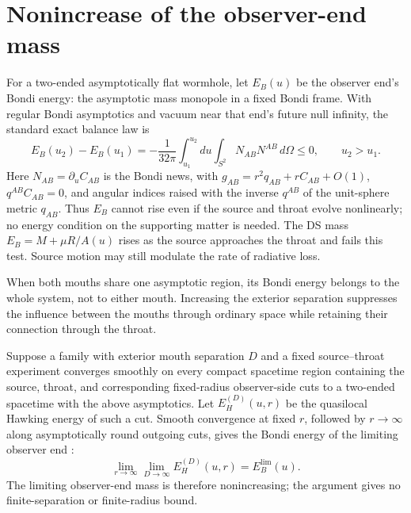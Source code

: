 \documentclass[aps,prd,10pt,onecolumn,nofootinbib,superscriptaddress,floatfix]{revtex4-2}
\begin{document}
\section{Nonincrease of the observer-end mass}
\label{sec:nonlinear}

For a two-ended asymptotically flat wormhole, let $E_B(u)$ be the observer
end's Bondi energy: the asymptotic mass monopole in a fixed Bondi frame.
With regular Bondi asymptotics and vacuum near that end's future null
infinity, the standard exact balance law is
\cite{BondiVanderBurgMetzner1962Gravitational,Sachs1962Asymptotic,
WaldZoupas2000Conserved}
\begin{equation}
 E_B(u_2)-E_B(u_1)
 =-\frac{1}{32\pi}\int_{u_1}^{u_2}du
    \int_{S^2}N_{AB}N^{AB}\,d\Omega\le0,
 \qquad u_2>u_1.
 \label{eq:bondi-integrated}
\end{equation}
Here $N_{AB}=\partial_u C_{AB}$ is the Bondi news, with
$g_{AB}=r^2q_{AB}+rC_{AB}+O(1)$, $q^{AB}C_{AB}=0$, and angular indices
raised with the inverse $q^{AB}$ of the unit-sphere metric $q_{AB}$.
Thus $E_B$ cannot rise even if
the source and throat evolve nonlinearly; no energy condition on the
supporting matter is needed.  The DS mass $E_B=M+\mu R/A(u)$ rises as the
source approaches the throat and fails this test.  Source motion may still
modulate the rate of radiative loss.

When both mouths share one asymptotic region, its Bondi energy belongs
to the whole system, not to either mouth.  Increasing the exterior
separation suppresses the influence between the mouths through ordinary
space while retaining their connection through the throat.

Suppose a family with exterior
mouth separation $D$ and a fixed source--throat experiment converges
smoothly on every compact spacetime region containing the source, throat,
and corresponding fixed-radius observer-side cuts to a two-ended
spacetime with the above asymptotics.  Let $E_H^{(D)}(u,r)$ be the quasilocal
Hawking energy of such a cut.  Smooth convergence at fixed $r$, followed by
$r\to\infty$ along asymptotically round outgoing cuts, gives the Bondi
energy of the limiting observer end \cite{MarsSoria2015HawkingEnergy}:
\begin{equation}
 \lim_{r\to\infty}\lim_{D\to\infty}E_H^{(D)}(u,r)
 =E_B^{\mathrm{lim}}(u).
 \label{eq:one-ended-limit}
\end{equation}
The limiting observer-end mass is therefore nonincreasing; the argument
gives no finite-separation or finite-radius bound.
\end{document}
